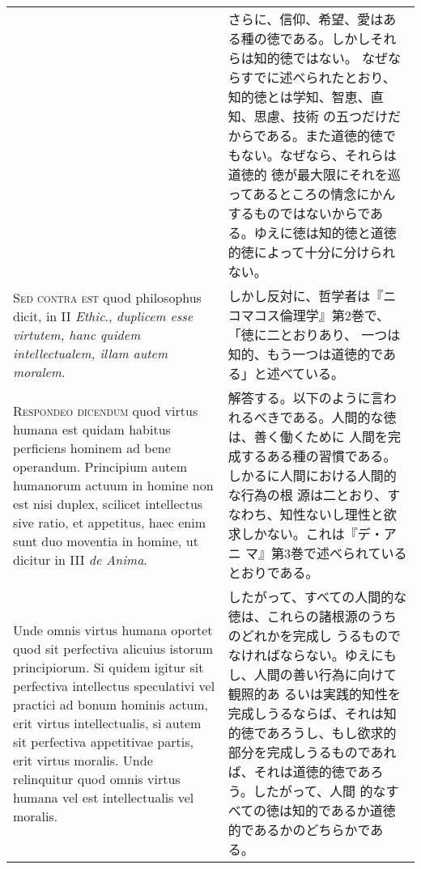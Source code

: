 \documentclass[10pt]{jsarticle}
\begin{document}
\begin{longtable}{p{21em}p{21em}}
&

さらに、信仰、希望、愛はある種の徳である。しかしそれらは知的徳ではない。
なぜならすでに述べられたとおり、知的徳とは学知、智恵、直知、思慮、技術
の五つだけだからである。また道徳的徳でもない。なぜなら、それらは道徳的
徳が最大限にそれを巡ってあるところの情念にかんするものではないからであ
る。ゆえに徳は知的徳と道徳的徳によって十分に分けられない。

\\



{\scshape Sed contra est} quod philosophus dicit, in II {\itshape
Ethic}., {\itshape duplicem esse virtutem, hanc quidem intellectualem,
illam autem moralem}.

&

しかし反対に、哲学者は『ニコマコス倫理学』第2巻で、「徳に二とおりあり、
一つは知的、もう一つは道徳的である」と述べている。

\\



{\scshape Respondeo dicendum} quod virtus humana est quidam habitus
perficiens hominem ad bene operandum. Principium autem humanorum
actuum in homine non est nisi duplex, scilicet intellectus sive ratio,
et appetitus, haec enim sunt duo moventia in homine, ut dicitur in III
{\itshape de Anima}. 

&

解答する。以下のように言われるべきである。人間的な徳は、善く働くために
人間を完成するある種の習慣である。しかるに人間における人間的な行為の根
源は二とおり、すなわち、知性ないし理性と欲求しかない。これは『デ・アニ
マ』第3巻で述べられているとおりである。

\\

Unde omnis virtus humana oportet quod sit
perfectiva alicuius istorum principiorum. Si quidem igitur sit
perfectiva intellectus speculativi vel practici ad bonum hominis
actum, erit virtus intellectualis, si autem sit perfectiva appetitivae
partis, erit virtus moralis. Unde relinquitur quod omnis virtus humana
vel est intellectualis vel moralis.

&

したがって、すべての人間的な徳は、これらの諸根源のうちのどれかを完成し
うるものでなければならない。ゆえにもし、人間の善い行為に向けて観照的あ
るいは実践的知性を完成しうるならば、それは知的徳であろうし、もし欲求的
部分を完成しうるものであれば、それは道徳的徳であろう。したがって、人間
的なすべての徳は知的であるか道徳的であるかのどちらかである。


\end{longtable}
\end{document}
